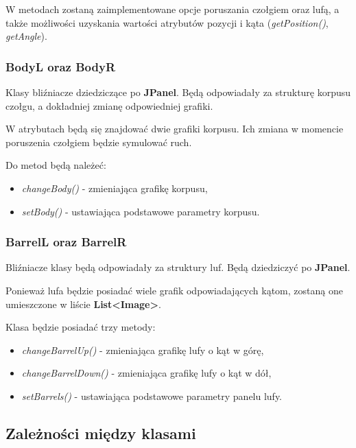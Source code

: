 \documentclass[a4paper]{article}
\begin{document}
W metodach zostan\k{a} zaimplementowane opcje poruszania czo\l{}giem oraz luf\k{a}, a tak\.ze mo\.zliwo\'sci uzyskania warto\'sci atrybut\'ow pozycji i k\k{a}ta (\textit{getPosition()}, \textit{getAngle}).

\subsubsection{BodyL oraz BodyR}

\quad Klasy bli\'zniacze dziedzicz\k{a}ce po \textbf{JPanel}. B\k{e}d\k{a} odpowiada\l{}y za struktur\k{e} korpusu czo\l{}gu, a dok\l{}adniej zmian\k{e} odpowiedniej grafiki. 

W atrybutach b\k{e}d\k{a} si\k{e} znajdowa\'c dwie grafiki korpusu. Ich zmiana w momencie poruszenia czo\l{}giem b\k{e}dzie symulowa\'c ruch.

Do metod b\k{e}d\k{a} nale\.ze\'c:
\begin{itemize}
    \item \textit{changeBody()} - zmieniaj\k{a}ca grafik\k{e} korpusu,
    \item \textit{setBody()} - ustawiaj\k{a}ca podstawowe parametry korpusu.
\end{itemize}


\subsubsection{BarrelL oraz BarrelR}

\quad Bli\'zniacze klasy b\k{e}d\k{a} odpowiada\l{}y za struktury luf. B\k{e}d\k{a} dziedziczy\'c po \textbf{JPanel}.

Poniewa\.z lufa b\k{e}dzie posiada\'c wiele grafik odpowiadaj\k{a}cych k\k{a}tom, zostan\k{a} one umieszczone w li\'scie \textbf{List<Image>}.

Klasa b\k{e}dzie posiada\'c trzy metody:
\begin{itemize}
    \item \textit{changeBarrelUp()} - zmieniaj\k{a}ca grafik\k{e} lufy o k\k{a}t w g\'or\k{e},
    \item \textit{changeBarrelDown()} - zmieniaj\k{a}ca grafik\k{e} lufy o k\k{a}t w d\'o\l{},
    \item \textit{setBarrels()} - ustawiaj\k{a}ca podstawowe parametry panelu lufy.
\end{itemize}

\subsection{Zale\.zno\'sci mi\k{e}dzy klasami}
\end{document}
